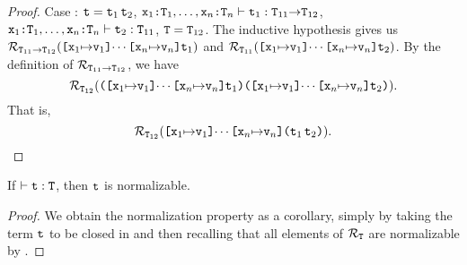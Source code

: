 \documentclass[11pt,twoside=off,numbers=noenddot]{scrbook}
\begin{document}
\begin{proof}
  Case : $\texttt{t} = \texttt{t}_1\,\texttt{t}_2$, \quad
  $\texttt{$\texttt{x}_1$:$\texttt{T}_1$}, \dots,
  \texttt{$\texttt{x}_n$:$\texttt{T}_n$} \vdash \texttt{t}_1 :
  \texttt{$\texttt{T}_{11}$$\rightarrow$$\texttt{T}_{12}$}$, \quad
  $\texttt{$\texttt{x}_1$:$\texttt{T}_1$}, \dots,
  \texttt{$\texttt{x}_n$:$\texttt{T}_n$} \vdash \texttt{t}_2 : \texttt{T}_{11}$,
  \quad $\texttt{T} = \texttt{T}_{12}$. The inductive hypothesis gives us
  $\mathcal{R}_{\texttt{$\texttt{T}_{11}$$\rightarrow$$\texttt{T}_{12}$}}(\texttt{[$\texttt{x}_1$$\mapsto$$\texttt{v}_1$]$\cdots$[$\texttt{x}_n$$\mapsto$$\texttt{v}_n$]$\texttt{t}_1$})$
  and
  $\mathcal{R}_{\texttt{T}_{11}}(\texttt{[$\texttt{x}_1$$\mapsto$$\texttt{v}_1$]$\cdots$[$\texttt{x}_n$$\mapsto$$\texttt{v}_n$]$\texttt{t}_2$})$.
  By the definition of
  $\mathcal{R}_{\texttt{$\texttt{T}_{11}$$\rightarrow$$\texttt{T}_{12}$}}$, we have
  \[
    \mathcal{R}_{\texttt{T}_{12}}(\texttt{([$\texttt{x}_1$$\mapsto$$\texttt{v}_1$]$\cdots$[$\texttt{x}_n$$\mapsto$$\texttt{v}_n$]$\texttt{t}_1$)([$\texttt{x}_1$$\mapsto$$\texttt{v}_1$]$\cdots$[$\texttt{x}_n$$\mapsto$$\texttt{v}_n$]$\texttt{t}_2$)}).
  \]
  That is,
  \[
    \mathcal{R}_{\texttt{T}_{12}}(\texttt{[$\texttt{x}_1$$\mapsto$$\texttt{v}_1$]$\cdots$[$\texttt{x}_n$$\mapsto$$\texttt{v}_n$]($\texttt{t}_1$\,$\texttt{t}_2$)}).
  \]
\end{proof}

\begin{theorem}[Normalization]
  If $\vdash \texttt{t} : \texttt{T}$, then $\texttt{t}$ is normalizable.
\end{theorem}

\begin{proof}
  We obtain the normalization property as a corollary, simply by
  taking the term $\texttt{t}$ to be closed in
   and then recalling that all
  elements of $\mathcal{R}_{\texttt{T}}$ are normalizable by
  .
\end{proof}
\end{document}
